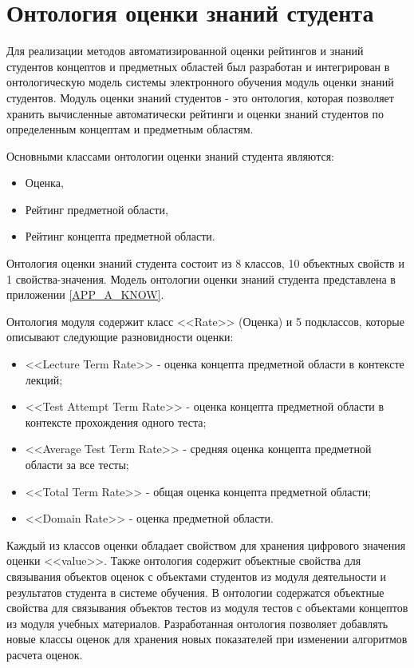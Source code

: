 \section{Онтология оценки знаний студента} \label{sect2_5}

Для реализации методов автоматизированной оценки рейтингов и знаний студентов концептов и предметных областей был разработан и интегрирован в онтологическую модель системы электронного обучения модуль оценки знаний студентов. Модуль оценки знаний студентов - это онтология, которая позволяет хранить вычисленные автоматически рейтинги и оценки знаний студентов по определенным концептам и предметным областям. 

Основными классами онтологии оценки знаний студента являются:

\begin{itemize}
\item Оценка,
\item Рейтинг предметной области,
\item Рейтинг концепта предметной области.
\end{itemize}

Онтология оценки знаний студента состоит из 8 классов, 10 объектных свойств и 1 свойства-значения. Модель онтологии оценки знаний студента  представлена в приложении \ref{APP_A_KNOW}.

Онтология модуля содержит класс <<Rate>> (Оценка) и 5 подклассов, которые описывают следующие разновидности оценки:

\begin{itemize}
\item <<Lecture Term Rate>> - оценка концепта предметной области в контексте лекций; 
\item <<Test Attempt Term Rate>> - оценка концепта предметной области в контексте прохождения одного теста;
\item <<Average Test Term Rate>> - средняя оценка концепта предметной области за все тесты;
\item <<Total Term Rate>> - общая оценка концепта предметной области; 
\item <<Domain Rate>> - оценка предметной области. 
\end{itemize}

Каждый из классов оценки обладает свойством для хранения цифрового значения оценки <<value>>. Также онтология содержит объектные свойства для связывания объектов оценок с объектами студентов из модуля деятельности и результатов студента в системе обучения. В онтологии содержатся объектные свойства для связывания объектов тестов из модуля тестов с объектами концептов из модуля учебных материалов. Разработанная онтология позволяет добавлять новые классы оценок для хранения новых показателей при изменении алгоритмов расчета оценок.


